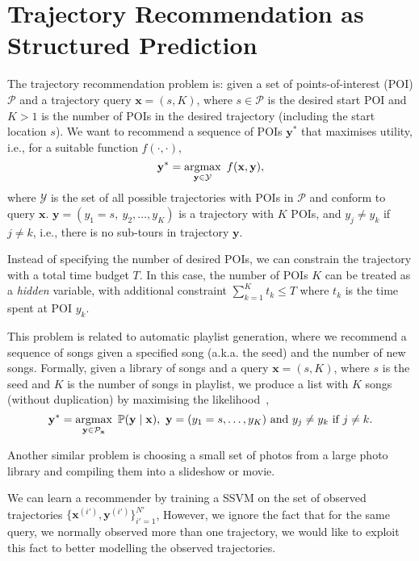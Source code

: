 \section{Trajectory Recommendation as Structured Prediction}
\label{sec:trajrec}

The trajectory recommendation problem is: given a set of points-of-interest (POI) $\mathcal{P}$ and a trajectory query $\mathbf{x} = (s, K)$,
where $s \in \mathcal{P}$ is the desired start POI and $K > 1$ is the number of POIs in the desired trajectory (including the start location $s$).
We want to recommend a sequence of POIs $\mathbf{y}^*$ that maximises utility, i.e., for a suitable function $f(\cdot,\cdot)$,
\begin{equation*}
\mathbf{y}^* = \operatorname*{argmax}_{\mathbf{y} \in \mathcal{Y}}~f(\mathbf{x}, \mathbf{y}),
\end{equation*}
where $\mathcal{Y}$ is the set of all possible trajectories with POIs in $\mathcal{P}$ and conform to query $\mathbf{x}$.
$\mathbf{y} = (y_1 = s,~ y_2, \dots, y_K)$ is a trajectory with $K$ POIs, and $y_j \ne y_k$ if $j \ne k$, 
i.e.,
there is no sub-tours in trajectory $\mathbf{y}$.


Instead of specifying the number of desired POIs, we can constrain the trajectory with a total time budget $T$.
In this case, the number of POIs $K$ can be treated as a \emph{hidden} variable, with additional constraint $\sum_{k=1}^K t_k \le T$
where $t_k$ is the time spent at POI $y_k$.


This problem is related to automatic playlist generation,
where we recommend a sequence of songs given a specified song (a.k.a. the seed) and the number of new songs.
Formally, given a library of songs and a query $\mathbf{x} = (s, K)$, where $s$ is the seed and $K$ is the number of songs in playlist,
we produce a list with $K$ songs (without duplication) by maximising the likelihood~\cite{chen2012playlist},
\begin{equation*}
\mathbf{y}^* = \operatorname*{argmax}_{\mathbf{y} \in \mathcal{P}_\mathbf{x}}~ \mathbb{P}(\mathbf{y} \mid \mathbf{x}),~ \mathbf{y} = (y_1=s,\dots,y_K)
~\text{and}~ y_j \ne y_k ~\text{if}~ j \ne k.
\end{equation*}

Another similar problem is choosing a small set of photos from a large photo library and compiling them into a slideshow or movie.


We can learn a recommender by training a SSVM on the set of observed trajectories $\{\mathbf{x}^{(i')}, \mathbf{y}^{(i')}\}_{i'=1}^{N'}$,
However, we ignore the fact that for the same query, we normally observed more than one trajectory,
we would like to exploit this fact to better modelling the observed trajectories.


